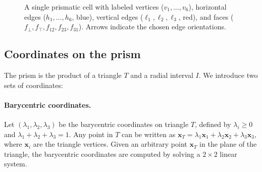 \documentclass[11pt,a4paper]{article}
\begin{document}
\begin{figure}[ht]
\caption{A single prismatic cell with labeled vertices ($v_1,\ldots,v_6$),
  horizontal edges ($h_1,\ldots,h_6$, blue), vertical edges
  ($\ell_1,\ell_2,\ell_3$, red), and faces ($f_\bot, f_\top, f_{12}, f_{23},
  f_{31}$). Arrows indicate the chosen edge orientations.}
\label{fig:prism}
\end{figure}

\subsection{Coordinates on the prism}
\label{sec:coordinates}

The prism is the product of a triangle $T$ and a radial interval $I$.
We introduce two sets of coordinates:

\paragraph{Barycentric coordinates.}
Let $(\lambda_1, \lambda_2, \lambda_3)$ be the barycentric coordinates on
triangle $T$, defined by $\lambda_i \geq 0$ and
$\lambda_1 + \lambda_2 + \lambda_3 = 1$. Any point in $T$ can be written as
$\bm{x}_T = \lambda_1 \bm{x}_1 + \lambda_2 \bm{x}_2 + \lambda_3 \bm{x}_3$,
where $\bm{x}_i$ are the triangle vertices. Given an arbitrary point $\bm{x}_T$
in the plane of the triangle, the barycentric coordinates are computed by
solving a $2\times 2$ linear system.
\end{document}
